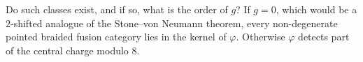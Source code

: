 \begin{question}
\label{qn:order_g}
Do such classes exist, and if so, what is the order of $g$? If $g=0$, which would be a $2$-shifted
analogue of the Stone--von Neumann theorem, every non-degenerate pointed braided fusion category lies in the kernel
of $\varphi$. Otherwise $\varphi$ detects part of the central charge modulo $8$.
\end{question}
